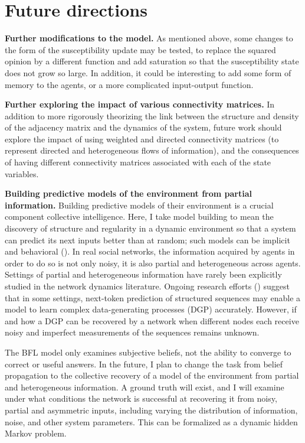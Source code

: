 \documentclass[]{article}
\begin{document}
\newpage

\section{Future directions}

\textbf{Further modifications to the model.} As mentioned above, some changes to the form of the susceptibility update may be tested, to replace the squared opinion by a different function and add saturation so that the susceptibility state does not grow so large. In addition, it could be interesting to add some form of memory to the agents, or a more complicated input-output function.

\textbf{Further exploring the impact of various connectivity matrices.} In addition to more rigorously theorizing the link between the structure and density of the adjacency matrix and the dynamics of the system, future work should explore the impact of using weighted and directed connectivity matrices (to represent directed and heterogeneous flows of information), and the consequences of having different connectivity matrices associated with each of the state variables.

\textbf{Building predictive models of the environment from partial information.} Building predictive models of their environment is a crucial component collective intelligence. Here, I take model building to mean the discovery of structure and regularity in a dynamic environment so that a system can predict its next inputs better than at random; such models can be implicit and behavioral (\cite{crutchfieldCalculiEmergenceComputation1994}). In real social networks, the information acquired by agents in order to do so is not only noisy, it is also partial and heterogeneous across agents. Settings of partial and heterogeneous information have rarely been explicitly studied in the network dynamics literature. Ongoing research efforts (\cite{malachAutoRegressiveNextTokenPredictors2023}) suggest that in some settings, next-token prediction of structured sequences may enable a model to learn complex data-generating processes (DGP) accurately. However, if and how a DGP can be recovered by a network when different nodes each receive noisy and imperfect measurements of the sequences remains unknown.

The BFL model only examines subjective beliefs, not the ability to converge to correct or useful answers. In the future, I plan to change the task from belief propagation to the collective recovery of a model of the environment from partial and heterogeneous information. A ground truth will exist, and I will examine under what conditions the network is successful at recovering it from noisy, partial and asymmetric inputs, including varying the distribution of information, noise, and other system parameters. This can be formalized as a dynamic hidden Markov problem.
\end{document}
